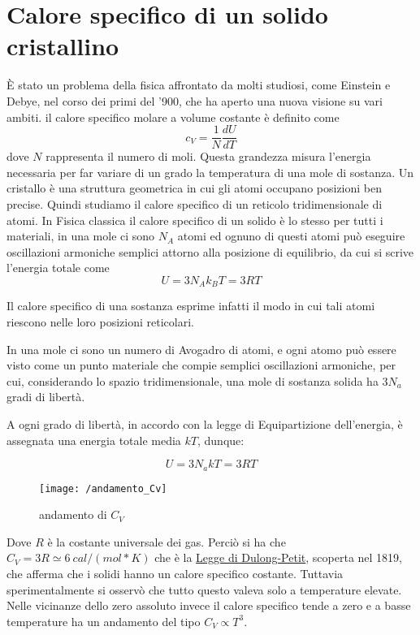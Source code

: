 

\section{Calore specifico di un solido cristallino}
È stato un problema della fisica affrontato da molti studiosi, come Einstein e Debye, nel corso dei primi del '900, che ha aperto una nuova visione su vari ambiti.
il calore specifico molare a volume costante è definito come
\begin{equation}
c_V = \frac{1}{N} \frac{dU}{dT}
\end{equation}
dove $N$ rappresenta il numero di moli.
Questa grandezza misura l'energia necessaria per far variare di un grado la temperatura di una mole di sostanza.
Un cristallo è una struttura geometrica in cui gli atomi occupano posizioni ben precise.
Quindi studiamo il calore specifico di un reticolo tridimensionale di atomi.
In Fisica classica il calore specifico di un solido è lo stesso per tutti i materiali, in una mole ci sono $N_A$ atomi ed ognuno di questi atomi può eseguire oscillazioni armoniche semplici attorno alla posizione di equilibrio, da cui si scrive l'energia totale come
\begin{equation}
U = 3 N_A k_B T = 3 R T
\end{equation}




\newpage


Il calore specifico di una sostanza esprime infatti il modo in cui tali atomi riescono nelle loro posizioni reticolari.

In una mole ci sono un numero di Avogadro di atomi, e ogni atomo può essere visto come un punto materiale che compie semplici oscillazioni armoniche, per cui,
considerando lo spazio tridimensionale, una mole di sostanza solida ha $3 N_a$ gradi di libertà.

A ogni grado di libertà, in accordo con la legge di Equipartizione dell'energia, è assegnata una energia totale media $kT$, dunque:

\begin{equation}
U = 3 N_a k T = 3 R T
\end{equation}
\begin{figure}[h]
\centering
\texttt{[image: /andamento\_Cv]}
\caption{andamento di $C_V$}
\end{figure}
Dove $R$ è la costante universale dei gas. 
Perciò si ha che $C_V = 3 R \simeq \SI{6}{cal / (mol * K)}$ che è la \underline{Legge di Dulong-Petit}, scoperta nel 1819, che afferma che i solidi hanno un calore specifico costante. 
Tuttavia sperimentalmente si osservò che tutto questo valeva solo a temperature elevate.
Nelle vicinanze dello zero assoluto invece il calore specifico tende a zero e a basse temperature ha un andamento del tipo $C_V \propto T^3$.

